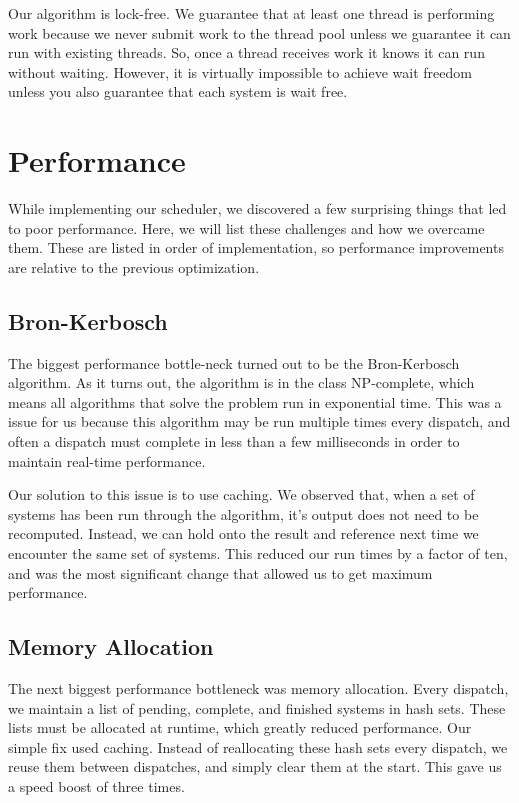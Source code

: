 \documentclass[conference]{IEEEtran}
\begin{document}
Our algorithm is lock-free. We guarantee that at least one thread is performing work because we never submit work to the thread pool unless we guarantee it can run with existing threads. So, once a thread receives work it knows it can run without waiting. However, it is virtually impossible to achieve wait freedom unless you also guarantee that each system is wait free. 

\section{Performance}

While implementing our scheduler, we discovered a few surprising things that led to poor performance. Here, we will list these challenges and how we overcame them. These are listed in order of implementation, so performance improvements are relative to the previous optimization.

\subsection{Bron-Kerbosch}

The biggest performance bottle-neck turned out to be the Bron-Kerbosch algorithm. As it turns out, the algorithm is in the class NP-complete, which means all algorithms that solve the problem run in exponential time. This was a issue for us because this algorithm may be run multiple times every dispatch, and often a dispatch must complete in less than a few milliseconds in order to maintain real-time performance. 

Our solution to this issue is to use caching. We observed that, when a set of systems has been run through the algorithm, it's output does not need to be recomputed. Instead, we can hold onto the result and reference next time we encounter the same set of systems. This reduced our run times by a factor of ten, and was the most significant change that allowed us to get maximum performance.

\subsection{Memory Allocation}

The next biggest performance bottleneck was memory allocation. Every dispatch, we maintain a list of pending, complete, and finished systems in hash sets. These lists must be allocated at runtime, which greatly reduced performance. Our simple fix used caching. Instead of reallocating these hash sets every dispatch, we reuse them between dispatches, and simply clear them at the start. This gave us a speed boost of three times.
\end{document}
